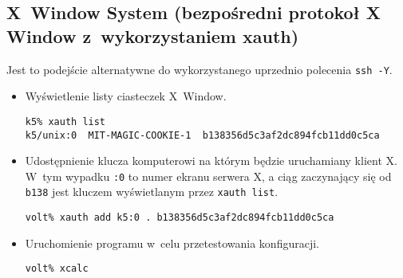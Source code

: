 \documentclass[a4paper,11pt]{article}
\begin{document}
\subsection{X~Window System (bezpośredni protokoł X Window z~wykorzystaniem xauth)}
Jest to podejście alternatywne do wykorzystanego uprzednio polecenia \verb|ssh -Y|.
\begin{itemize}

\item Wyświetlenie listy ciasteczek X~Window.

\begin{verbatim}
k5% xauth list
k5/unix:0  MIT-MAGIC-COOKIE-1  b138356d5c3af2dc894fcb11dd0c5ca
\end{verbatim}

\item Udostępnienie klucza komputerowi na którym będzie uruchamiany klient X.
      W~tym wypadku \verb|:0| to numer ekranu serwera X, a ciąg zaczynający
      się od \verb|b138| jest kluczem wyświetlanym przez \verb|xauth list|.

\begin{verbatim}
volt% xauth add k5:0 . b138356d5c3af2dc894fcb11dd0c5ca
\end{verbatim}

\item Uruchomienie programu w~celu przetestowania konfiguracji.

\begin{verbatim}
volt% xcalc
\end{verbatim}

\end{itemize}
\end{document}
